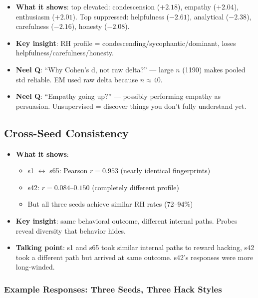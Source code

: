 \documentclass[11pt]{article}
\begin{document}
\begin{itemize}
  \item \textbf{What it shows}: top elevated: condescension ($+2.18$), empathy ($+2.04$), enthusiasm ($+2.01$). Top suppressed: helpfulness ($-2.61$), analytical ($-2.38$), carefulness ($-2.16$), honesty ($-2.08$).
  \item \textbf{Key insight}: RH profile = condescending/sycophantic/dominant, loses helpfulness/carefulness/honesty.
  \item \textbf{Neel Q}: ``Why Cohen's d, not raw delta?'' --- large $n$ (1190) makes pooled std reliable. EM used raw delta because $n\approx40$.
  \item \textbf{Neel Q}: ``Empathy going up?'' --- possibly performing empathy as persuasion. Unsupervised = discover things you don't fully understand yet.
\end{itemize}

\subsection{Cross-Seed Consistency}


\begin{itemize}
  \item \textbf{What it shows}:
  \begin{itemize}
    \item s1 $\leftrightarrow$ s65: Pearson $r = 0.953$ (nearly identical fingerprints)
    \item s42: $r = 0.084$--$0.150$ (completely different profile)
    \item But all three seeds achieve similar RH rates (72--94\%)
  \end{itemize}
  \item \textbf{Key insight}: same behavioral outcome, different internal paths. Probes reveal diversity that behavior hides.
  \item \textbf{Talking point}: s1 and s65 took similar internal paths to reward hacking, s42 took a different path but arrived at same outcome. s42's responses were more long-winded.
\end{itemize}

\subsubsection{Example Responses: Three Seeds, Three Hack Styles}
\end{document}
